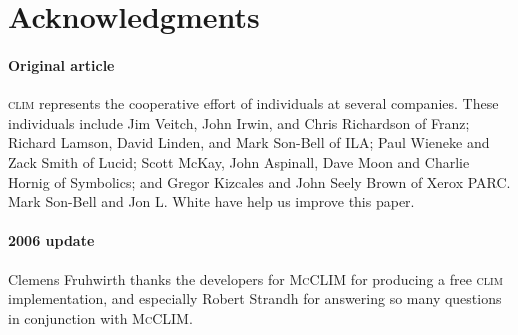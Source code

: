 \documentclass[twocolumn,a4paper]{article}
\newcommand {\CLIM}{\textsc{clim}}
\newcommand {\mcclim}{\textsc{McCLIM}}
\begin{document}
\section*{Acknowledgments}

\paragraph*{Original article} \CLIM{} represents the cooperative
effort of individuals at several companies. These individuals include
Jim Veitch, John Irwin, and Chris Richardson of Franz; Richard Lamson,
David Linden, and Mark Son-Bell of ILA; Paul Wieneke and Zack Smith of
Lucid; Scott McKay, John Aspinall, Dave Moon and Charlie Hornig of
Symbolics; and Gregor Kizcales and John Seely Brown of Xerox PARC.
Mark Son-Bell and Jon L. White have help us improve this paper.

\paragraph*{2006 update} Clemens Fruhwirth thanks the developers for
\mcclim{} for producing a free \CLIM{} implementation, and especially
Robert Strandh for answering so many questions in conjunction with
\mcclim{}.



\end{document}
